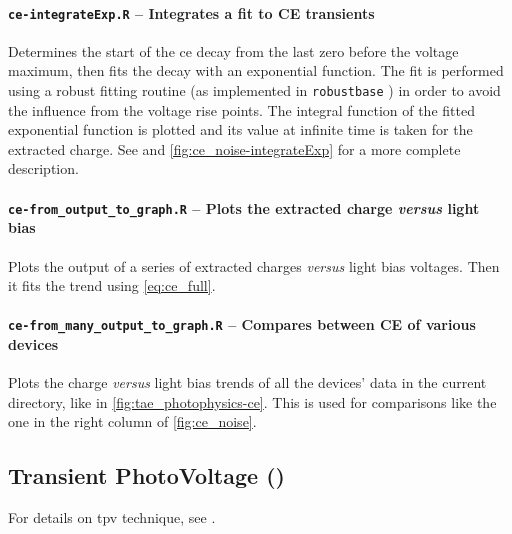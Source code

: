 		\paragraph{\texttt{ce-\-integrateExp.R} -- Integrates a fit to CE transients}
		Determines the start of the \gls{ce} decay from the last zero before the voltage maximum, then fits the decay with an exponential function.
		The fit is performed using a robust fitting routine (as implemented in \texttt{robust\-base} \cite{Maechler2018}) in order to avoid the influence from the voltage rise points.
		The integral function of the fitted exponential function is plotted and its value at infinite time is taken for the extracted charge.
				See  and \cref{fig:ce_noise-integrateExp} for a more complete description.
				
		\paragraph{\texttt{ce-\-from\_output\_to\_graph.R} -- Plots the extracted charge \textsl{versus} light bias}
		Plots the output of a series of extracted charges \textsl{versus} light bias voltages.
		Then it fits the trend using \cref{eq:ce_full}.
		
		\paragraph{\texttt{ce-\-from\_many\_output\_to\_graph.R} -- Compares between CE of various devices}
		Plots the charge \textsl{versus} light bias trends of all the devices' data in the current directory, like in \cref{fig:tae_photophysics-ce}.
		This is used for comparisons like the one in the right column of \cref{fig:ce_noise}.
		

	\subsection{Transient PhotoVoltage ()}\label{r_tpv}
	For details on \gls{tpv} technique, see .
	
